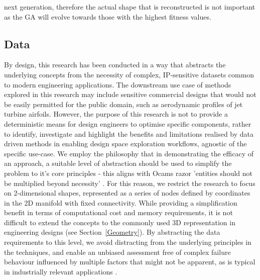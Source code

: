 \documentclass{article}
\begin{document}
next generation, therefore the actual shape that is reconstructed is not important as the GA will evolve towards those with the highest fitness values.

\subsection{Data}
By design, this research has been conducted in a way that abstracts the underlying concepts from the necessity of complex, IP-sensitive datasets common to modern engineering applications. The downstream use case of methods explored in this research may include sensitive commercial designs that would not be easily permitted for the public domain, such as aerodynamic profiles of jet turbine airfoils. However, the purpose of this research is not to provide a deterministic means for design engineers to optimise specific components, rather to identify, investigate and highlight the benefits and limitations realised by data driven methods in enabling design space exploration workflows, agnostic of the specific use-case. We employ the philosophy that in demonstrating the efficacy of an approach, a suitable level of abstraction should be used to simplify the problem to it's core principles - this aligns with Ocams razor 'entities should not be multiplied beyond necessity' \citep{Gori2024}. For this reason, we restrict the research to focus on 2-dimensional shapes, represented as a series of nodes defined by coordinates in the 2D manifold with fixed connectivity. While providing a simplification benefit in terms of computational cost and memory requirements, it is not difficult to extend the concepts to the commonly used 3D representation in engineering designs (see Section~\ref{Geometry}). By abstracting the data requirements to this level, we avoid distracting from the underlying principles in the techniques, and enable an unbiased assessment free of complex failure behaviour influenced by
multiple factors that might not be apparent, as is typical in industrially relevant applications \citep{Hobbs2021}.
\end{document}
